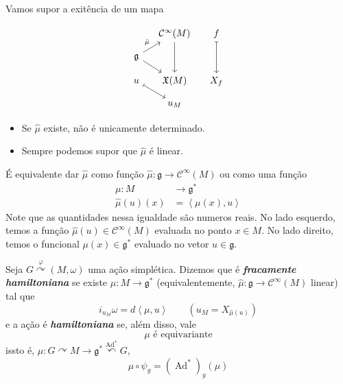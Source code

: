 Vamos supor a exitência de um mapa

\[\begin{tikzcd}[ column sep=small,row sep=small]
	&\mathcal{C}^\infty(M)\arrow[dd]& f\arrow[dd,maps to]\\
\mathfrak{g} \arrow[ur,"\hat{\mu}"]\arrow[dr]\\
u\arrow[dr, maps to]&\mathfrak{X}(M)&X_f\\
&u_M
\end{tikzcd}\]

\begin{remark}\leavevmode 
	\begin{itemize}
	\item Se $\hat{\mu}$ existe, não é unicamente determinado.
	\item Sempre podemos supor que $\hat{\mu}$ é linear.
	\end{itemize}
	\item É equivalente dar $\hat{\mu}$ como função $\hat{\mu}:\mathfrak{g} \longrightarrow \mathcal{C}^\infty(M)$ ou como uma função
		\begin{align*}
			\mu: M &\longrightarrow \mathfrak{g}^* \\
			\hat{\mu}(u)(x) & =\left<\mu(x),u\right>  
		\end{align*}
		Note que as quantidades nessa igualdade são numeros reais. No lado esquerdo, temos a função $\hat{\mu}(u)\in\mathcal{C}^\infty(M)$ evaluada no ponto $x\in M$. No lado direito, temos o funcional $\mu(x)\in\mathfrak{g}^*$ evaluado no vetor $u\in\mathfrak{g}$.
\end{remark}

\begin{defn}\leavevmode
	Seja $G\overset{\varphi}{\curvearrowright}(M,\omega)$ uma ação simplética. Dizemos que é \textit{\textbf{fracamente hamiltoniana}} se existe  $\mu:M\to \mathfrak{g}^*$ (equivalentemente, $\hat{ \mu}:\mathfrak{g} \longrightarrow \mathcal{C}^\infty(M)$ linear) tal que
	 \begin{equation}\label{eq:a}
	i_{u_M}\omega=d\left<\mu,u\right> \qquad (u_M=X_{\hat{\mu}(u)})	 	
	 \end{equation}
	e a ação é \textit{\textbf{hamiltoniana}} se, além disso, vale
	\begin{equation}\label{eq:b}
		\mu\text{ é equivariante} 
	\end{equation}
	issto é, $\mu:G \curvearrowright M\longrightarrow \mathfrak{g}^*  \overset{\operatorname{Ad}^*}{\curvearrowleft}G$,
	\[\mu\circ \psi_g=(\operatorname{Ad}^*)_g(\mu)\]
\end{defn}

